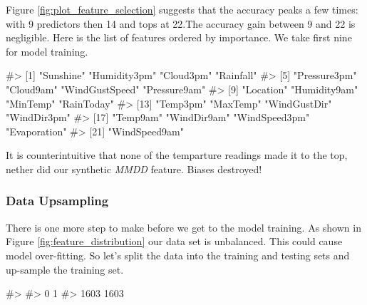 Figure \ref{fig:plot_feature_selection} suggests that the accuracy peaks
a few times: with 9 predictors then 14 and tops at 22.The accuracy gain
between 9 and 22 is negligible. Here is the list of features ordered by
importance. We take first nine for model training.

\begin{Schunk}
\begin{Soutput}
#>  [1] "Sunshine"      "Humidity3pm"   "Cloud3pm"      "Rainfall"     
#>  [5] "Pressure3pm"   "Cloud9am"      "WindGustSpeed" "Pressure9am"  
#>  [9] "Location"      "Humidity9am"   "MinTemp"       "RainToday"    
#> [13] "Temp3pm"       "MaxTemp"       "WindGustDir"   "WindDir3pm"   
#> [17] "Temp9am"       "WindDir9am"    "WindSpeed3pm"  "Evaporation"  
#> [21] "WindSpeed9am"
\end{Soutput}
\end{Schunk}

It is counterintuitive that none of the temparture readings made it to
the top, nether did our synthetic \emph{MMDD} feature. Biases destroyed!

\hypertarget{data-upsampling}{%
\subsubsection{Data Upsampling}\label{data-upsampling}}

There is one more step to make before we get to the model training. As
shown in Figure \ref{fig:feature_distribution} our data set is
unbalanced. This could cause model over-fitting. So let's split the data
into the training and testing sets and up-sample the training set.

\begin{Schunk}
\begin{Soutput}
#> 
#>    0    1 
#> 1603 1603
\end{Soutput}
\end{Schunk}

